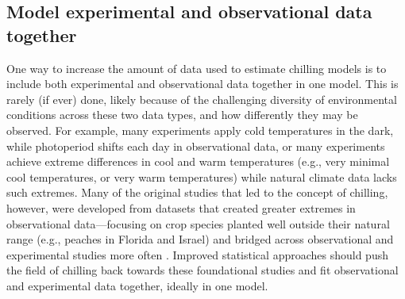 \documentclass[11pt]{article}
\begin{document}
\subsection*{Model experimental and observational data together} 

One way to increase the amount of data used to estimate chilling models is to include both experimental and observational data together in one model. This is rarely (if ever) done, likely because of the challenging diversity of environmental conditions across these two data types, and how differently they may be observed. 
For example, many experiments apply cold temperatures in the dark, while photoperiod shifts each day in observational data, or many experiments achieve extreme differences in cool and warm temperatures (e.g., very minimal cool temperatures, or very warm temperatures) while natural climate data lacks such extremes. Many of the original studies that led to the concept of chilling, however, were developed from datasets that created greater extremes in observational data---focusing on crop species planted well outside their natural range (e.g., peaches in Florida and Israel) and bridged across observational and experimental studies more often \citep{erez1971,richardson1974}. Improved statistical approaches should push the field of chilling back towards these foundational studies and fit observational and experimental data together, ideally in one model.  
\end{document}

